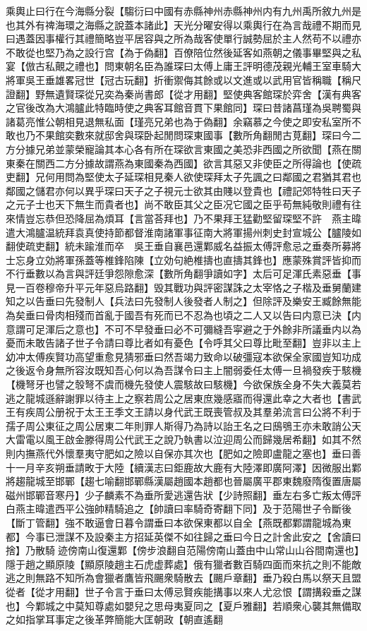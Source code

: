 乘輿止曰行在今海縣分裂【騶衍曰中國有赤縣神州赤縣神州内有九州禹所敘九州是也其外有禆海環之海縣之說蓋本諸此】天光分曜安得以乘輿行在為言哉禮不期而見曰遇蓋因事權行其禮簡略豈平居容與之所為哉客使單行誠勢屈於主人然苟不以禮亦不敢從也堅乃為之設行宫【為于偽翻】百僚陪位然後延客如燕朝之儀事畢堅與之私宴【倣古私覿之禮也】問東朝名臣為誰琛曰太傅上庸王評明德茂親光輔王室車騎大將軍吳王垂雄畧冠世【冠古玩翻】折衝禦侮其餘或以文進或以武用官皆稱職【稱尺證翻】野無遺賢琛從兄奕為秦尚書郎【從才用翻】堅使典客館琛於弈舍【漢有典客之官後改為大鴻臚此特臨時使之典客耳館音貫下果館同】琛曰昔諸菖瑾為吳聘蜀與諸葛亮惟公朝相見退無私面【瑾亮兄弟也為于偽翻】余竊慕之今使之即安私室所不敢也乃不果館奕數來就邸舍與琛卧起閒問琛東國事【數所角翻閒古莧翻】琛曰今二方分據兄弟並蒙榮寵論其本心各有所在琛欲言東國之美恐非西國之所欲聞【燕在關東秦在關西二方分據故謂燕為東國秦為西國】欲言其惡又非使臣之所得論也【使疏吏翻】兄何用問為堅使太子延琛相見秦人欲使琛拜太子先諷之曰鄰國之君猶其君也鄰國之儲君亦何以異乎琛曰天子之子視元士欲其由賤以登貴也【禮記郊特牲曰天子之元子士也天下無生而貴者也】尚不敢臣其父之臣况它國之臣乎苟無純敬則禮有往來情豈忘恭但恐降屈為煩耳【言當荅拜也】乃不果拜王猛勸堅留琛堅不許　燕主暐遣大鴻臚温統拜袁真使持節都督淮南諸軍事征南大將軍揚州刺史封宣城公【臚陵如翻使疏吏翻】統未踰淮而卒　吳王垂自襄邑還鄴威名益振太傅評愈忌之垂奏所募將士忘身立効將軍孫蓋等椎鋒陷陳【立効句絶椎擣也直擣其鋒也】應蒙殊賞評皆抑而不行垂數以為言與評廷爭怨隙愈深【數所角翻爭讀如字】太后可足渾氏素惡垂【事見一百卷穆帝升平元年惡烏路翻】毁其戰功與評密謀誅之太宰恪之子楷及垂舅蘭建知之以告垂曰先發制人【兵法曰先發制人後發者人制之】但除評及樂安王臧餘無能為矣垂曰骨肉相殘而首亂于國吾有死而已不忍為也頃之二人又以告曰内意已決【内意謂可足渾后之意也】不可不早發垂曰必不可彌縫吾寜避之于外餘非所議垂内以為憂而未敢告諸子世子令請曰尊比者如有憂色【令呼其父曰尊比毗至翻】豈非以主上幼冲太傅疾賢功高望重愈見猜邪垂曰然吾竭力致命以破彊寇本欲保全家國豈知功成之後返令身無所容汝既知吾心何以為吾謀令曰主上闇弱委任太傅一旦禍發疾于駭機【機弩牙也譬之彀弩不虞而機先發使人震駭故曰駭機】今欲保族全身不失大義莫若逃之龍城遜辭謝罪以待主上之察若周公之居東庶幾感寤而得還此幸之大者也【書武王有疾周公册祝于太王王季文王請以身代武王既喪管叔及其羣弟流言曰公將不利于孺子周公東征之周公居東二年則罪人斯得乃為詩以詒王名之曰䲭鴞王亦未敢誚公天大雷電以風王啟金滕得周公代武王之說乃執書以泣迎周公而歸幾居希翻】如其不然則内撫燕代外懷羣夷守肥如之險以自保亦其次也【肥如之險即盧龍之塞也】垂曰善十一月辛亥朔垂請畋于大陸【續漢志曰鉅鹿故大鹿有大陸澤即廣阿澤】因微服出鄴將趨龍城至邯鄲【趨七喻翻邯鄲縣漢屬趙國本趙都也晉屬廣平郡東魏廢隋復置唐屬磁州邯鄲音寒丹】少子麟素不為垂所愛逃還告狀【少詩照翻】垂左右多亡叛太傅評白燕主暐遣西平公強帥精騎追之【帥讀曰率騎奇寄翻下同】及于范陽世子令斷後【斷丁管翻】強不敢逼會日暮令謂垂曰本欲保東都以自全【燕既都鄴謂龍城為東都】今事已泄謀不及設秦主方招延英傑不如往歸之垂曰今日之計舍此安之【舍讀曰捨】乃散騎迹傍南山復還鄴【傍步浪翻自范陽傍南山蓋由中山常山山谷間南還也】隱于趙之顯原陵【顯原陵趙主石虎虚葬處】俄有獵者數百騎四面而來抗之則不能敵逃之則無路不知所為會獵者鷹皆飛颺衆騎散去【颺戶章翻】垂乃殺白馬以祭天且盟從者【從才用翻】世子令言于垂曰太傅忌賢疾能搆事以來人尤忿恨【謂搆殺垂之謀也】今鄴城之中莫知尊處如嬰兒之思母夷夏同之【夏戶雅翻】若順衆心襲其無備取之如指掌耳事定之後革弊簡能大匡朝政【朝直遙翻